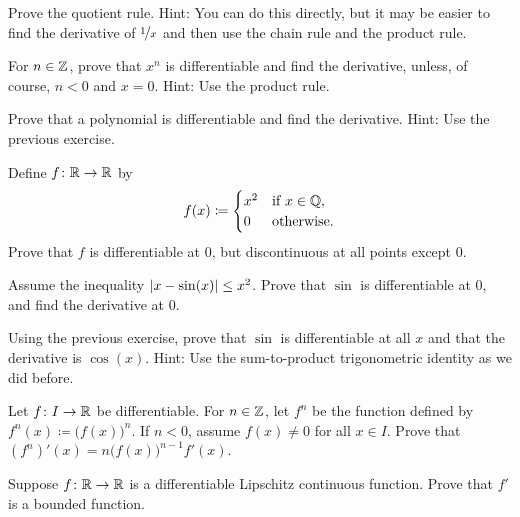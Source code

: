 \begin{exercise}
Prove the quotient rule.  Hint: You can do this directly, but it may be
easier to find the derivative of $\nicefrac{1}{x}$ and then use
the chain rule and the product rule.
\end{exercise}

\begin{exercise} \label{exercise:diffofxn}
For $n \in {\mathbb{Z}}$,
prove that $x^n$ is differentiable and find the derivative,
unless, of course, $n < 0$ and $x=0$.
Hint: Use the product rule.
\end{exercise}

\begin{exercise}
Prove that a polynomial is differentiable and find the derivative.
Hint: Use the previous exercise.
\end{exercise}

\begin{exercise}
Define $f \colon {\mathbb{R}} \to {\mathbb{R}}$ by
\begin{equation*}
f(x) \coloneqq
\begin{cases}
x^2 & \text{if } x \in {\mathbb{Q}},\\
0 & \text{otherwise.}
\end{cases}
\end{equation*}
Prove that $f$ is differentiable at $0$, but discontinuous at all points
except $0$.
\end{exercise}

\begin{exercise}
Assume the inequality $\left\lvert {x-\sin(x)} \right\rvert \leq x^2$.  Prove that $\sin$ is
differentiable at $0$, and find the derivative at $0$.
\end{exercise}

\begin{exercise}
Using the previous exercise, prove that $\sin$ is differentiable at all $x$
and that the derivative is $\cos(x)$.  Hint: Use the sum-to-product
trigonometric identity as we did before.
\end{exercise}

\begin{exercise}
Let $f \colon I \to {\mathbb{R}}$ be differentiable.  For $n \in {\mathbb{Z}}$, let $f^n$
be the function defined by $f^n(x) \coloneqq {\bigl( f(x) \bigr)}^n$.  If
$n < 0$, assume $f(x) \not= 0$ for all $x \in I$.  Prove that
$(f^n)'(x) = n {\bigl(f(x) \bigr)}^{n-1} f'(x)$.
\end{exercise}

\begin{exercise}
Suppose $f \colon {\mathbb{R}} \to {\mathbb{R}}$ is a differentiable
Lipschitz continuous function.
Prove that $f'$ is a bounded function.
\end{exercise}

